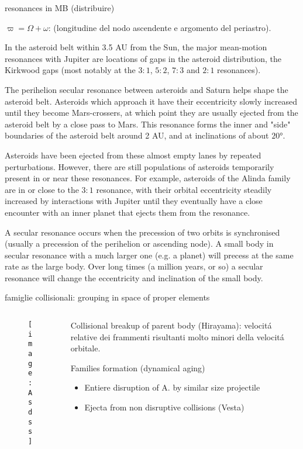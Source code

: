 \begin{wordonframe}{resonances in MB (distribuire)}

$\varpi=\Omega+\omega$: (longitudine del nodo ascendente e argomento del periastro).

In the asteroid belt within 3.5 AU from the Sun, the major mean-motion resonances with Jupiter are locations of gaps in the asteroid distribution, the Kirkwood gaps (most notably at the $3:1$, $5:2$, $7:3$ and $2:1$ resonances).

The perihelion secular resonance between asteroids and Saturn  helps shape the asteroid belt. Asteroids which approach it have their eccentricity slowly increased until they become Mars-crossers, at which point they are usually ejected from the asteroid belt by a close pass to Mars. This resonance forms the inner and "side" boundaries of the asteroid belt around 2 AU, and at inclinations of about $\ang{20}$.

Asteroids have been ejected from these almost empty lanes by repeated perturbations. However, there are still populations of asteroids temporarily present in or near these resonances. For example, asteroids of the Alinda family are in or close to the $3:1$ resonance, with their orbital eccentricity steadily increased by interactions with Jupiter until they eventually have a close encounter with an inner planet that ejects them from the resonance.

A secular resonance occurs when the precession of two orbits is synchronised (usually a precession of the perihelion or ascending node). A small body in secular resonance with a much larger one (e.g. a planet) will precess at the same rate as the large body. Over long times (a million years, or so) a secular resonance will change the eccentricity and inclination of the small body.
\end{wordonframe}

\begin{frame}{famiglie collisionali: grouping in space of proper elements}
\begin{columns}[T]
\begin{column}{0.65\textwidth}
\begin{figure}[!ht]
\texttt{[image: Asdss]}
\end{figure}
\end{column}
\begin{column}{0.35\textwidth}
Collisional breakup of parent body (Hirayama): velocit\'a relative dei frammenti risultanti molto minori della velocit\'a orbitale.
\begin{block}{Families formation (dynamical aging)}
\begin{itemize}\item Entiere disruption of A. by similar size projectile \item Ejecta from non disruptive collisions (Vesta)
\end{itemize}
\end{block}
\end{column}
\end{columns}
\end{frame}

